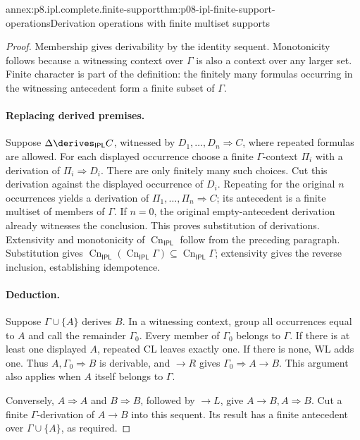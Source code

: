 \begin{annexitem}{annex:p8.ipl.complete.finite-support}{thm:p08-ipl-finite-support-operations}{Derivation operations with finite multiset supports}
\begin{proof}
Membership gives derivability by the identity sequent. Monotonicity follows
because a witnessing context over \(\Gamma\) is also a context over any
larger set. Finite character is part of the definition: the finitely many
formulas occurring in the witnessing antecedent form a finite subset of
\(\Gamma\).

\paragraph{Replacing derived premises.}
Suppose \(\Delta\derives_{\mathsf{IPL}}C\), witnessed by
\(D_1,\ldots,D_n\Rightarrow C\), where repeated formulas are allowed.
For each displayed occurrence choose a finite \(\Gamma\)-context
\(\Pi_i\) with a derivation of \(\Pi_i\Rightarrow D_i\).
There are only finitely many such choices. Cut this derivation against
the displayed occurrence of \(D_i\). Repeating for the original
\(n\) occurrences yields a derivation of
\(\Pi_1,\ldots,\Pi_n\Rightarrow C\); its antecedent is a finite
multiset of members of \(\Gamma\). If \(n=0\), the original
empty-antecedent derivation already witnesses the conclusion.
This proves substitution of derivations. Extensivity and monotonicity
of \(\operatorname{Cn}_{\mathsf{IPL}}\) follow from the preceding
paragraph. Substitution gives
\(\operatorname{Cn}_{\mathsf{IPL}}(\operatorname{Cn}_{\mathsf{IPL}}\Gamma)
\subseteq\operatorname{Cn}_{\mathsf{IPL}}\Gamma\); extensivity gives
the reverse inclusion, establishing idempotence.

\paragraph{Deduction.}
Suppose \(\Gamma\cup\{A\}\) derives \(B\). In a witnessing
context, group all occurrences equal to \(A\) and call the remainder
\(\Gamma_0\). Every member of \(\Gamma_0\) belongs to \(\Gamma\).
If there is at least one displayed \(A\), repeated CL leaves exactly
one. If there is none, WL adds one. Thus
\(A,\Gamma_0\Rightarrow B\) is derivable, and \(\to R\) gives
\(\Gamma_0\Rightarrow A\to B\). This argument also applies when
\(A\) itself belongs to \(\Gamma\).

Conversely, \(A\Rightarrow A\) and \(B\Rightarrow B\), followed
by \(\to L\), give \(A\to B,A\Rightarrow B\). Cut a finite
\(\Gamma\)-derivation of \(A\to B\) into this sequent. Its result
has a finite antecedent over \(\Gamma\cup\{A\}\), as required.


\end{proof}
\end{annexitem}
